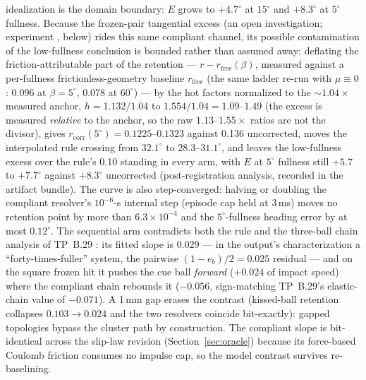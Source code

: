 idealization is the domain boundary: $E$ grows to $+4.7^\circ$ at
$15^\circ$ and $+8.3^\circ$ at $5^\circ$ fullness. Because the
frozen-pair tangential excess (an open investigation; experiment
, below) rides this same compliant channel, its
possible contamination of the low-fullness conclusion is bounded rather
than assumed away: deflating the friction-attributable part of the
retention --- $r - r_{\mathrm{free}}(\beta)$, measured against a
per-fullness frictionless-geometry baseline $r_{\mathrm{free}}$ (the same
ladder re-run with $\mu \equiv 0$: 0.096 at $\beta = 5^\circ$, 0.078 at
$60^\circ$) --- by the  hot factors normalized to the
${\sim}1.04\times$ measured anchor, $h = 1.132/1.04$ to $1.554/1.04 =
1.09$--$1.49$ (the excess is measured \emph{relative} to the anchor, so
the raw $1.13$--$1.55\times$ ratios are not the divisor), gives
$r_{\mathrm{corr}}(5^\circ) = 0.1225$--$0.1323$ against
0.136 uncorrected, moves the interpolated rule crossing from
$32.1^\circ$ to $28.3$--$31.1^\circ$, and leaves the low-fullness excess
over the rule's 0.10 standing in every arm, with $E$ at $5^\circ$
fullness still $+5.7$ to $+7.7^\circ$ against $+8.3^\circ$ uncorrected
(post-registration analysis, recorded in the artifact bundle). The
curve is
also step-converged: halving or doubling the compliant resolver's
$10^{-6}$-s internal step (episode cap held at 3\,ms) moves no retention
point by more than $6.3\times10^{-4}$ and the $5^\circ$-fullness heading
error by at most $0.12^\circ$. The sequential arm
contradicts both the rule and the three-ball chain analysis of TP~B.29
\citep{alciatore_tp_catalog}: its fitted slope is 0.029 --- in the
output's characterization a ``forty-times-fuller'' system, the pairwise
$(1-e_b)/2 = 0.025$ residual --- and on the square frozen hit it pushes
the cue ball \emph{forward} ($+0.024$ of impact speed) where the
compliant chain rebounds it ($-0.056$, sign-matching TP~B.29's
elastic-chain value of $-0.071$). A 1\,mm gap erases the contrast
(kissed-ball retention collapses $0.103 \to 0.024$ and the two resolvers
coincide bit-exactly): gapped topologies bypass the cluster path by
construction. The compliant slope is bit-identical across the
slip-law revision (Section~\ref{sec:oracle}) because its force-based
Coulomb friction consumes no impulse cap, so the model contrast survives
re-baselining.

